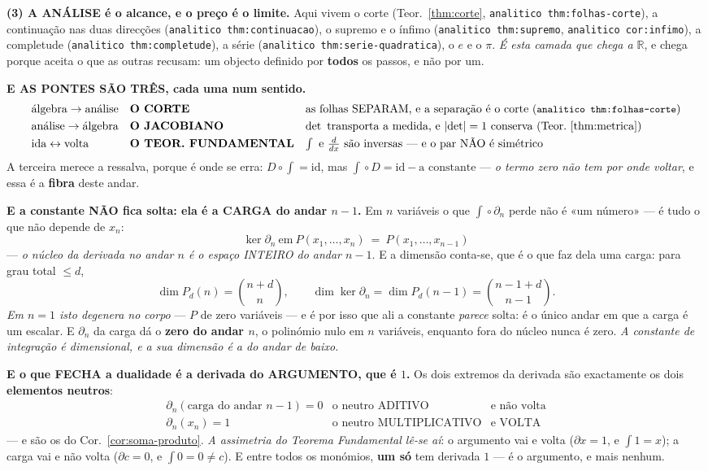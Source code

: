 \documentclass[11pt,a4paper]{article}
\newcommand{\code}[1]{\texttt{\small #1}}
\newcommand{\abs}[1]{\lvert #1\rvert}
\begin{document}
\textbf{(3) A ANÁLISE é o alcance, e o preço é o limite.} Aqui vivem o corte
(Teor.~\ref{thm:corte}, \code{analitico thm:folhas-corte}), a continuação nas duas direcções
(\code{analitico thm:continuacao}), o supremo e o ínfimo (\code{analitico thm:supremo},
\code{analitico cor:infimo}), a completude (\code{analitico thm:completude}), a série
(\code{analitico thm:serie-quadratica}), o $e$ e o $\pi$. \emph{É esta camada que chega a
$\mathbb{R}$}, e chega porque aceita o que as outras recusam: um objecto definido por
\textbf{todos} os passos, e não por um.

\medskip
\noindent\textbf{E AS PONTES SÃO TRÊS, cada uma num sentido.}
\[
\begin{array}{lll}
\text{álgebra}\to\text{análise} & \textbf{O CORTE} &
\text{as folhas SEPARAM, e a separação é o corte (\code{analitico thm:folhas-corte})}\\[3pt]
\text{análise}\to\text{álgebra} & \textbf{O JACOBIANO} &
\det\text{ transporta a medida, e }\abs{\det}=1\text{ conserva (Teor.~\ref{thm:metrica})}\\[3pt]
\text{ida}\leftrightarrow\text{volta} & \textbf{O TEOR. FUNDAMENTAL} &
\int\text{ e }\tfrac{d}{dx}\text{ são inversas --- e o par NÃO é simétrico}
\end{array}
\]
A terceira merece a ressalva, porque é onde se erra: $D\circ\!\int=\mathrm{id}$, mas
$\int\!\circ D=\mathrm{id}-\text{a constante}$ --- \emph{o termo zero não tem por onde
voltar}, e essa é a \textbf{fibra} deste andar.

\textbf{E a constante NÃO fica solta: ela é a CARGA do andar $n-1$.} Em $n$ variáveis o que
$\int\!\circ\partial_n$ perde não é «um número» --- é tudo o que não depende de $x_n$:
\[
\boxed{\;\ker\partial_n\ \text{em}\ P(x_1,\ldots,x_n)\ =\ P(x_1,\ldots,x_{n-1})\;}
\]
--- \emph{o núcleo da derivada no andar $n$ é o espaço INTEIRO do andar $n-1$}. E a
dimensão conta-se, que é o que faz dela uma carga: para grau total $\leq d$,
\[
\dim P_d(n)=\binom{n+d}{n},
\qquad
\dim\ker\partial_n=\dim P_d(n-1)=\binom{n-1+d}{n-1}.
\]
\emph{Em $n=1$ isto degenera no corpo} --- $P$ de zero variáveis --- e é por isso que ali a
constante \emph{parece} solta: é o único andar em que a carga é um escalar. E
$\partial_n$ da carga dá o \textbf{zero do andar $n$}, o polinómio nulo em $n$ variáveis,
enquanto fora do núcleo nunca é zero. \emph{A constante de integração é dimensional, e a
sua dimensão é a do andar de baixo.}

\textbf{E o que FECHA a dualidade é a derivada do ARGUMENTO, que é $1$.} Os dois extremos
da derivada são exactamente os dois \textbf{elementos neutros}:
\[
\boxed{
\begin{array}{lll}
\partial_n(\text{carga do andar }n{-}1) = 0 & \text{o neutro ADITIVO} & \text{e não volta}\\[2pt]
\partial_n(x_n) = 1 & \text{o neutro MULTIPLICATIVO} & \text{e VOLTA}
\end{array}}
\]
--- e são os do Cor.~\ref{cor:soma-produto}. \emph{A assimetria do Teorema Fundamental
lê-se aí}: o argumento vai e volta ($\partial x=1$, e $\int1=x$); a carga vai e não volta
($\partial c=0$, e $\int0=0\neq c$). E entre todos os monómios, \textbf{um só} tem derivada
$1$ --- é o argumento, e mais nenhum.
\end{document}

